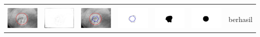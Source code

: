 \begin{table}[H]
\begin{tabular}{|m{0.7in}|m{0.7in}|m{0.7in}|m{0.7in}|m{0.7in}|m{0.7in}|m{0.7in}|}
		&  &  & & & &  \\
		\includegraphics[width=0.7in]{dataset/dataset_3/luka_kuning/ready/21_integer_init.jpg}&
		\includegraphics[width=0.7in]{dataset/dataset_3/luka_kuning/ready/21_integer_ext.jpg}&
		\includegraphics[width=0.7in]{dataset/dataset_3/luka_kuning/ready/21_integer_result.jpg}&
		\includegraphics[width=0.7in]{dataset/dataset_3/luka_kuning/ready/21_gt_r_integer.jpg}&
		\includegraphics[width=0.7in]{dataset/dataset_3/luka_kuning/ready/21_r.jpg}&
		\includegraphics[width=0.7in]{dataset/dataset_3/luka_kuning/ready/21_integer_r.jpg}&
		berhasil\\
		\hline
		

\end{tabular}
\end{table}
